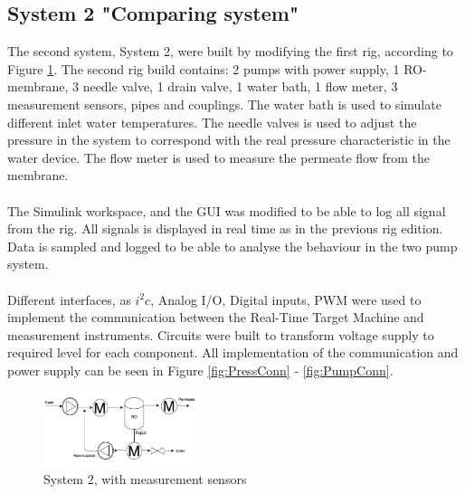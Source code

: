 \subsection{System 2  "Comparing system"}
The second system, System 2, were built by modifying the first rig, according to Figure \ref{fig:MeasSys2}. The second rig build contains: 2 pumps with power supply, 1 RO-membrane, 3 needle valve, 1 drain valve, 1 water bath, 1 flow meter, 3 measurement sensors, pipes and couplings. The water bath is used to simulate different inlet water temperatures. The needle valves is used to adjust the pressure in the system to correspond with the real pressure characteristic in the water device. The flow meter is used to measure the permeate flow from the membrane. \\
\\
The Simulink workspace, and the GUI was modified to be able to log all signal from the rig. All signals is displayed in real time as in the previous rig edition. Data is sampled and logged to be able to analyse the behaviour in the two pump system.  \\
\\
Different interfaces, as $i^{2}c$, Analog I/O, Digital inputs, PWM were used to implement the communication between the Real-Time Target Machine and measurement instruments. Circuits were built to transform voltage supply to required level for each component. All implementation of the communication and power supply can be seen in Figure \ref{fig:PressConn} - \ref{fig:PumpConn}. 

\begin{figure}[h]
    \centering
    \includegraphics[width=0.4\textwidth]{MeasSys2}
    \caption{System 2, with measurement sensors}
    \label{fig:MeasSys2}
\end{figure}

